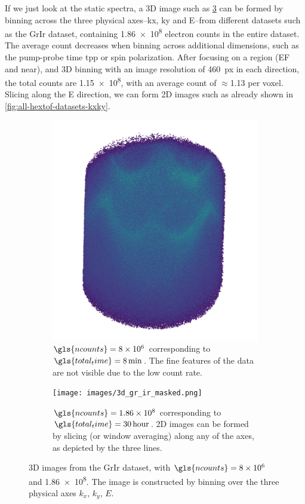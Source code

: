 If we just look at the static spectra, a 3D image such as \cref{fig:3d-gr-ir} can be formed by binning across the three physical axes--\gls{kx}, \gls{ky} and \gls{E}--from different datasets such as the \gls{GrIr} dataset, containing \num{1.86e8} electron counts in the entire dataset. The average count decreases when binning across additional dimensions, such as the pump-probe time \gls{tpp} or spin polarization. After focusing on a region (\gls{EF} and near), and 3D binning with an image resolution of \qty{460}{px} in each direction, the total counts are \num{1.15e8}, with an average count of $\approx$\num{1.13} per voxel. Slicing along the \gls{E} direction, we can form 2D images such as already shown in \cref{fig:all-hextof-datasets-kxky}.

\begin{figure}[h]
    \centering
    \begin{subfigure}[t]{0.49\linewidth}
        \centering
        \includegraphics[width=1\linewidth]{images/3d_gr_ir_8M.png}
        \caption{$\gls{ncounts}=\num{8e6}$ corresponding to $\gls{total_time}=\qty{8}{min}$. The fine features of the data are not visible due to the low count rate.}
        \label{fig:3d-gr-ir-8M}
    \end{subfigure}
    \hfill
    \begin{subfigure}[t]{0.49\linewidth}
        \centering
        \texttt{[image: images/3d\_gr\_ir\_masked.png]}
        \caption{$\gls{ncounts}=\num{1.86e8}$ corresponding to $\gls{total_time}=\qty{30}{hour}$. 2D images can be formed by slicing (or window averaging) along any of the axes, as depicted by the three lines.}
        \label{fig:3d-gr-ir-186M}
    \end{subfigure}
    \caption{3D images from the \gls{GrIr} dataset, with $\gls{ncounts}=\num{8e6}$ and \num{1.86e8}. The image is constructed by binning over the three physical axes $k_x$, $k_y$, $E$.}
    \label{fig:3d-gr-ir}
\end{figure}

